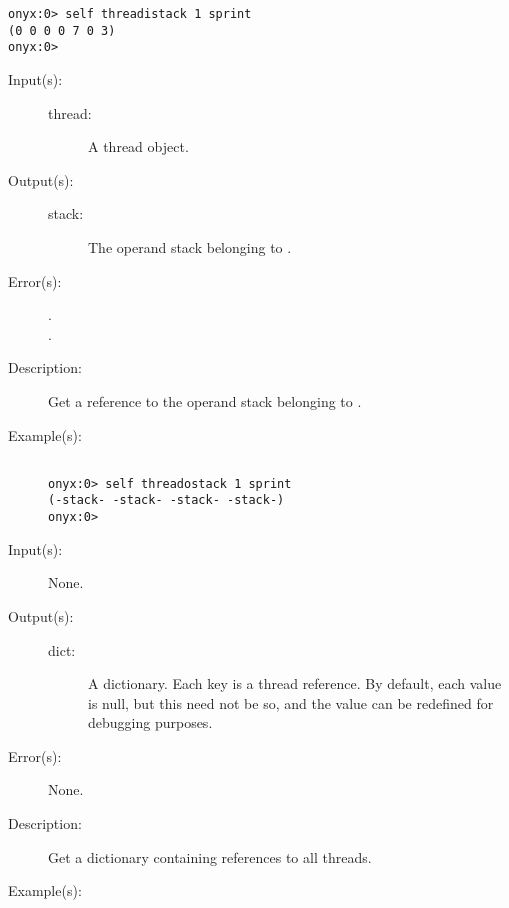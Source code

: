 \begin{description}
\begin{description}
\begin{verbatim}
onyx:0> self threadistack 1 sprint
(0 0 0 0 7 0 3)
onyx:0>
		\end{verbatim}
	\end{description}
\label{systemdict:threadostack}
\item[{\onyxop{thread}{threadostack}{stack}}: ]
	\begin{description}\item[]
	\item[Input(s): ]
		\begin{description}\item[]
		\item[thread: ]
			A thread object.
		\end{description}
	\item[Output(s): ]
		\begin{description}\item[]
		\item[stack: ]
			The operand stack belonging to .
		\end{description}
	\item[Error(s): ]
		\begin{description}\item[]
		\item[.]
		\item[.]
		\end{description}
	\item[Description: ]
		Get a reference to the operand stack belonging to
		.
	\item[Example(s): ]\begin{verbatim}

onyx:0> self threadostack 1 sprint
(-stack- -stack- -stack- -stack-)
onyx:0>
		\end{verbatim}
	\end{description}
\label{systemdict:threadsdict}
\item[{\onyxop{--}{threadsdict}{dict}}: ]
	\begin{description}\item[]
	\item[Input(s): ] None.
	\item[Output(s): ]
		\begin{description}\item[]
		\item[dict: ]
			A dictionary.  Each key is a thread reference.  By
			default, each value is null, but this need not be so,
			and the value can be redefined for debugging purposes.
		\end{description}
	\item[Error(s): ] None.
	\item[Description: ]
		Get a dictionary containing references to all threads.
	\item[Example(s): ]\begin{verbatim}


\end{verbatim}
\end{description}
\end{description}
